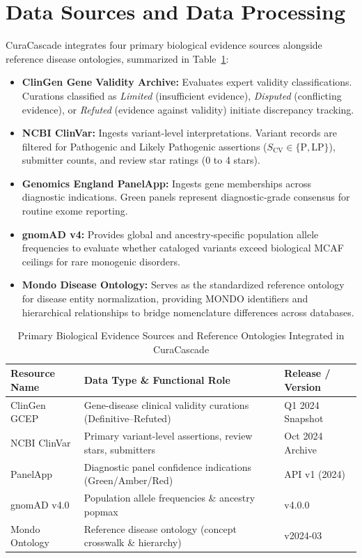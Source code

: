 \documentclass[conference]{IEEEtran}
\begin{document}
\section{Data Sources and Data Processing}
CuraCascade integrates four primary biological evidence sources alongside reference disease ontologies, summarized in Table~\ref{tab:sources}:
\begin{itemize}
    \item \textbf{ClinGen Gene Validity Archive:} Evaluates expert validity classifications. Curations classified as \textit{Limited} (insufficient evidence), \textit{Disputed} (conflicting evidence), or \textit{Refuted} (evidence against validity) initiate discrepancy tracking.
    \item \textbf{NCBI ClinVar:} Ingests variant-level interpretations. Variant records are filtered for Pathogenic and Likely Pathogenic assertions ($S_{\text{CV}} \in \{\text{P}, \text{LP}\}$), submitter counts, and review star ratings (0 to 4 stars).
    \item \textbf{Genomics England PanelApp:} Ingests gene memberships across diagnostic indications. Green panels represent diagnostic-grade consensus for routine exome reporting.
    \item \textbf{gnomAD v4:} Provides global and ancestry-specific population allele frequencies to evaluate whether cataloged variants exceed biological MCAF ceilings for rare monogenic disorders.
    \item \textbf{Mondo Disease Ontology:} Serves as the standardized reference ontology for disease entity normalization, providing MONDO identifiers and hierarchical relationships to bridge nomenclature differences across databases.
\end{itemize}

\begin{table}[t]
\caption{Primary Biological Evidence Sources and Reference Ontologies Integrated in CuraCascade}
\label{tab:sources}
\centering
\begin{tabularx}{\columnwidth}{lXl}
\toprule
\textbf{Resource Name} & \textbf{Data Type \& Functional Role} & \textbf{Release / Version} \\
\midrule
ClinGen GCEP & Gene-disease clinical validity curations (Definitive--Refuted) & Q1 2024 Snapshot \\
NCBI ClinVar & Primary variant-level assertions, review stars, submitters & Oct 2024 Archive \\
PanelApp & Diagnostic panel confidence indications (Green/Amber/Red) & API v1 (2024) \\
gnomAD v4.0 & Population allele frequencies \& ancestry popmax & v4.0.0 \\
\midrule
Mondo Ontology & Reference disease ontology (concept crosswalk \& hierarchy) & v2024-03 \\
\bottomrule
\end{tabularx}
\end{table}
\end{document}
